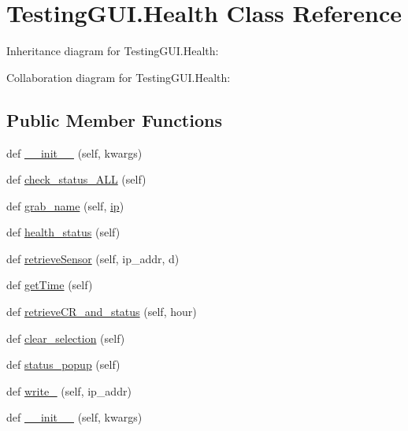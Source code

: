 \hypertarget{classTestingGUI_1_1Health}{}\section{Testing\+G\+U\+I.\+Health Class Reference}
\label{classTestingGUI_1_1Health}


Inheritance diagram for Testing\+G\+U\+I.\+Health\+:


Collaboration diagram for Testing\+G\+U\+I.\+Health\+:
\subsection*{Public Member Functions}
\begin{DoxyCompactItemize}
\item 
def \hyperlink{classTestingGUI_1_1Health_acf40a31363f46003573ea00664734fc3}{\+\_\+\+\_\+init\+\_\+\+\_\+} (self, kwargs)
\item 
def \hyperlink{classTestingGUI_1_1Health_aa382e2bc40e918613d90dbd819974420}{check\+\_\+status\+\_\+\+A\+LL} (self)
\item 
def \hyperlink{classTestingGUI_1_1Health_a236b797764a726c3fe2d68f2fabaceb8}{grab\+\_\+name} (self, \hyperlink{classTestingGUI_1_1Health_a2c897cb32dd28d657ac3f22c64a14543}{ip})
\item 
def \hyperlink{classTestingGUI_1_1Health_ac36ce2de8d9aa5f3b687da2f836f0b3d}{health\+\_\+status} (self)
\item 
def \hyperlink{classTestingGUI_1_1Health_afde04eeef599765553cce6069cff429e}{retrieve\+Sensor} (self, ip\+\_\+addr, d)
\item 
def \hyperlink{classTestingGUI_1_1Health_ad38efcab164d7bbb4ec16c2086dc7760}{get\+Time} (self)
\item 
def \hyperlink{classTestingGUI_1_1Health_a3a6e2fca0c7a691527b14c79b388f6fd}{retrieve\+C\+R\+\_\+and\+\_\+status} (self, hour)
\item 
def \hyperlink{classTestingGUI_1_1Health_a1e3b9ff5f630c5f6d47bfefe26cfb39b}{clear\+\_\+selection} (self)
\item 
def \hyperlink{classTestingGUI_1_1Health_a06c77fae7dd08337985a3420a2cdbc81}{status\+\_\+popup} (self)
\item 
def \hyperlink{classTestingGUI_1_1Health_a73ccf83145b4adf9452f85a061c23dc9}{write\+\_\+} (self, ip\+\_\+addr)
\item 
def \hyperlink{classTestingGUI_1_1Health_acf40a31363f46003573ea00664734fc3}{\+\_\+\+\_\+init\+\_\+\+\_\+} (self, kwargs)

\end{DoxyCompactItemize}
